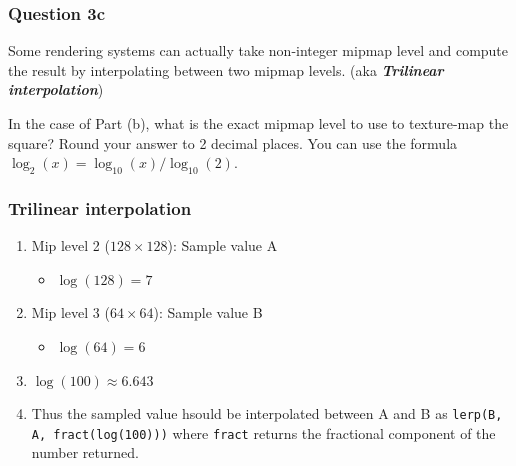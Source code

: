 \documentclass{beamer}
\begin{document}
\begin{frame}
    \frametitle{Question 3c}

    Some rendering systems can actually take non-integer mipmap level and compute the result by interpolating between 
    two mipmap levels. (aka \textbf{\textit{Trilinear interpolation}})

    \vspace{1em}
    
    In the case of Part (b), what is the exact mipmap level to use to texture-map the square? Round your answer to 2 decimal places. 
    You can use the formula $\log_2(x) = \log_{10}(x) / \log_{10}(2)$.

\end{frame}

\begin{frame}
    \frametitle{Trilinear interpolation}

    \begin{enumerate}
        \item Mip level 2 ($128 \times 128$): Sample value A
        \begin{itemize}
            \item $\log(128) = 7$
        \end{itemize}
        \item Mip level 3 ($64 \times 64$): Sample value B
        \begin{itemize}
            \item $\log(64) = 6$
        \end{itemize}
        \item $\log(100) \approx 6.643$
        \item Thus the sampled value hsould be interpolated between A and B as
        \texttt{lerp(B, A, fract(log(100)))} where \texttt{fract} returns the 
        fractional component of the number returned.
    \end{enumerate}

\end{frame}
\end{document}
